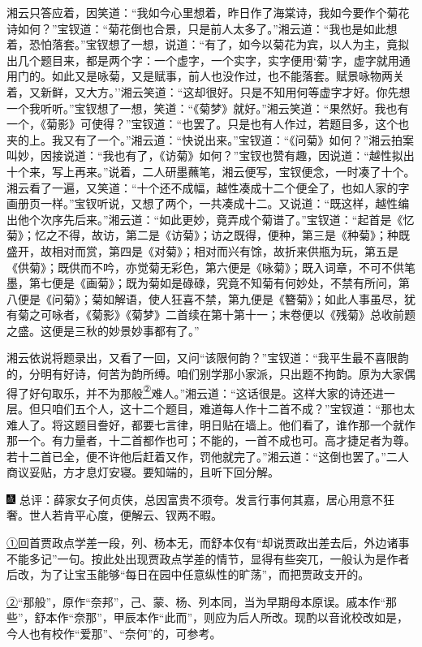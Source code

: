湘云只答应着，因笑道：``我如今心里想着，昨日作了海棠诗，我如今要作个菊花诗如何？''宝钗道：``菊花倒也合景，只是前人太多了。''湘云道：``我也是如此想着，恐怕落套。''宝钗想了一想，说道：``有了，如今以菊花为宾，以人为主，竟拟出几个题目来，都是两个字：一个虚字，一个实字，实字便用`菊'字，虚字就用通用门的。如此又是咏菊，又是赋事，前人也没作过，也不能落套。赋景咏物两关着，又新鲜，又大方。''湘云笑道：``这却很好。只是不知用何等虚字才好。你先想一个我听听。''宝钗想了一想，笑道：``《菊梦》就好。''湘云笑道：``果然好。我也有一个，《菊影》可使得？''宝钗道：``也罢了。只是也有人作过，若题目多，这个也夹的上。我又有了一个。''湘云道：``快说出来。''宝钗道：``《问菊》如何？''湘云拍案叫妙，因接说道：``我也有了，《访菊》如何？''宝钗也赞有趣，因说道：``越性拟出十个来，写上再来。''说着，二人研墨蘸笔，湘云便写，宝钗便念，一时凑了十个。湘云看了一遍，又笑道：``十个还不成幅，越性凑成十二个便全了，也如人家的字画册页一样。''宝钗听说，又想了两个，一共凑成十二。又说道：``既这样，越性编出他个次序先后来。''湘云道：``如此更妙，竟弄成个菊谱了。''宝钗道：``起首是《忆菊》；忆之不得，故访，第二是《访菊》；访之既得，便种，第三是《种菊》；种既盛开，故相对而赏，第四是《对菊》；相对而兴有馀，故折来供瓶为玩，第五是《供菊》；既供而不吟，亦觉菊无彩色，第六便是《咏菊》；既入词章，不可不供笔墨，第七便是《画菊》；既为菊如是碌碌，究竟不知菊有何妙处，不禁有所问，第八便是《问菊》；菊如解语，使人狂喜不禁，第九便是《簪菊》；如此人事虽尽，犹有菊之可咏者，《菊影》《菊梦》二首续在第十第十一；末卷便以《残菊》总收前题之盛。这便是三秋的妙景妙事都有了。''

湘云依说将题录出，又看了一回，又问``该限何韵？''宝钗道：``我平生最不喜限韵的，分明有好诗，何苦为韵所缚。咱们别学那小家派，只出题不拘韵。原为大家偶得了好句取乐，并不为那般\href{../Text/part0041_split_000.html\#lnkback_2_a}{\textsuperscript{②}}难人。''湘云道：``这话很是。这样大家的诗还进一层。但只咱们五个人，这十二个题目，难道每人作十二首不成？''宝钗道：``那也太难人了。将这题目誊好，都要七言律，明日贴在墙上。他们看了，谁作那一个就作那一个。有力量者，十二首都作也可；不能的，一首不成也可。高才捷足者为尊。若十二首已全，便不许他后赶着又作，罚他就完了。''湘云道：``这倒也罢了。''二人商议妥贴，方才息灯安寝。要知端的，且听下回分解。

{\includegraphics[width=3mm]{../Images/00005}  \kaishu 总评：薛家女子何贞侠，总因富贵不须夸。发言行事何其嘉，居心用意不狂奢。世人若肯平心度，便解云、钗两不暇。}

{\href{../Text/part0041_split_000.html\#navto_1_a}{①}回首贾政点学差一段，列、杨本无，而舒本仅有``却说贾政出差去后，外边诸事不能多记''一句。按此处出现贾政点学差的情节，显得有些突兀，一般认为是作者后改，为了让宝玉能够``每日在园中任意纵性的旷荡''，而把贾政支开的。}

{\href{../Text/part0041_split_000.html\#navto_2_a}{②}``那般''，原作``奈邦''，己、蒙、杨、列本同，当为早期母本原误。戚本作``那些''，舒本作``奈那''，甲辰本作``此而''，则应为后人所改。现酌以音讹校改如是，今人也有校作``爱那''、``奈何''的，可参考。}
